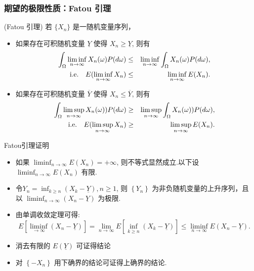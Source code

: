 \documentclass[Prob-All.tex]{subfiles}
\begin{document}
	\begin{frame}
		\frametitle{期望的极限性质：Fatou 引理}
		\begin{thm}
			(Fatou 引理) 若 $\{X_n\}$ 是一随机变量序列，
			\begin{itemize}
				\item 如果存在可积随机变量 $\underline{Y}$ 使得 $X_n\geq \underline{Y}$, 则有 \begin{eqnarray*}
					\int_{\Omega}\liminf_{n\rightarrow\infty}X_n(\omega)P(d\omega)&\leq& \liminf_{n\rightarrow\infty}\int_\Omega X_n(\omega)P(d\omega),  \\
					{\rm i.e. }\quad  E(\liminf_{n\rightarrow\infty}X_n)&\leq& \liminf_{n\rightarrow\infty}E(X_n).                                                                                           \end{eqnarray*}
				\item 如果存在可积随机变量 $\overline{Y}$ 使得 $X_n\leq \overline{Y}$, 则有 \begin{eqnarray*}                                                                                                          \int_{\Omega}\limsup_{n\rightarrow\infty} X_n (\omega)) P (d\omega)&\geq& \limsup_{n\rightarrow\infty}\int_\Omega X_n (\omega)) P (d\omega), \\
					{\rm i.e.} \quad    E(\limsup_{n\rightarrow\infty}X_n)&\geq& \limsup_{n\rightarrow\infty}E(X_n).                                                                                           \end{eqnarray*} \end{itemize}
		\end{thm}

	\end{frame}
\begin{frame}{Fatou引理证明}
	\begin{itemize}[<+-|alert@+>]
		\item 如果 $\liminf_{n\rightarrow\infty}E\left(X_n\right)=+\infty$, 则不等式显然成立.以下设 $\liminf_{n\rightarrow\infty}E\left(X_n\right)$ 有限.
		\item 令$Y_{n}=\inf_{k\geq n}\left(X_{k}-\underline{Y}\right),  n \geq 1$,	则 $\left\{Y_{n}\right\}$ 为非负随机变量的上升序列，且以 $\liminf_{n\rightarrow\infty}\left(X_n-\underline{Y}\right)$ 为极限.
		\item 由单调收敛定理可得: %
		\[
		E\left[\liminf_{\rightarrow\infty}\left(X_n-\underline{Y}\right)\right]=\lim_{n\rightarrow\infty} E\left[\inf_{k\geq n}\left(X_{k}-\underline{Y}\right)\right] \leq \liminf_{n\rightarrow\infty}E\left(X_n-\underline{Y}\right) .
		\]
		\item 消去有限的 $E(\underline{Y})$ 可证得结论
		\item 对 $\left\{-X_n\right\}$ 用下确界的结论可证得上确界的结论.%
	\end{itemize}

\end{frame}
\end{document}
